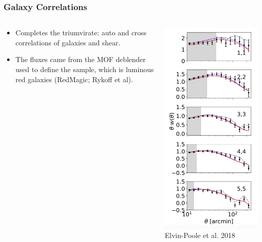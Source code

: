 \documentclass[aspectratio=169]{beamer}
\begin{document}
\frame
{

    \frametitle{Galaxy Correlations}


    \begin{columns}
        \begin{column}{0.5\textwidth}
            \begin{itemize}

                \item Completes the triumvirate:  auto and cross correlations
                    of galaxies and shear.

                \item The fluxes came from the MOF deblender used to define
                    the sample, which is luminous red galaxies 
                    (RedMagic; Rykoff et al).

            \end{itemize}

        \end{column}
        \begin{column}{0.5\textwidth}
            \centering
                \includegraphics[height=0.9\textheight]{galclustering-fig7a.png}
                \newline
                {\tiny Elvin-Poole et al. 2018}
        \end{column}


\end{columns}}
\end{document}
